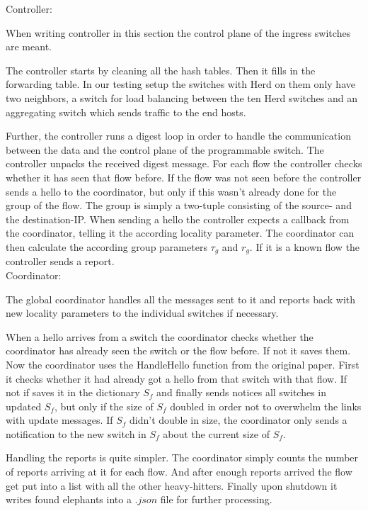 \documentclass[11pt,oneside,a4paper]{article}
\begin{document}
Controller:

When writing controller in this section the control plane of the ingress switches are meant. 

The controller starts by cleaning all the hash tables. Then it fills in the forwarding table. In our testing setup the switches with Herd on them only have two neighbors, a switch for load balancing between the ten Herd switches and an aggregating switch which sends traffic to the end hosts.

Further, the controller runs a digest loop in order to handle the communication between the data and the control plane of the programmable switch. The controller unpacks the received digest message. For each flow the controller checks whether it has seen that flow before. If the flow was not seen before the controller sends a hello to the coordinator, but only if this wasn't already done for the group of the flow. The group is simply a two-tuple consisting of the source- and the destination-IP. When sending a hello the controller expects a callback from the coordinator, telling it the according locality parameter. The coordinator can then calculate the according group parameters $\tau_g$ and $r_g$. If it is a known flow the controller sends a report. \\

Coordinator:

The global coordinator handles all the messages sent to it and reports back with new locality parameters to the individual switches if necessary. 

When a hello arrives from a switch the coordinator checks whether the coordinator has already seen the switch or the flow before. If not it saves them. Now the coordinator uses the HandleHello function from the original paper. First it checks whether it had already got a hello from that switch with that flow. If not if saves it in the dictionary $S_f$ and finally sends notices all switches in updated $S_f$, but only if the size of $S_f$ doubled in order not to overwhelm the links with update messages. If $S_f$ didn't double in size, the coordinator only sends a notification to the new switch in $S_f$ about the current size of $S_f$.

Handling the reports is quite simpler. The coordinator simply counts the number of reports arriving at it for each flow. And after enough reports arrived the flow get put into a list with all the other heavy-hitters. Finally upon shutdown it writes found elephants into a $.json$ file for further processing.\\
\end{document}
